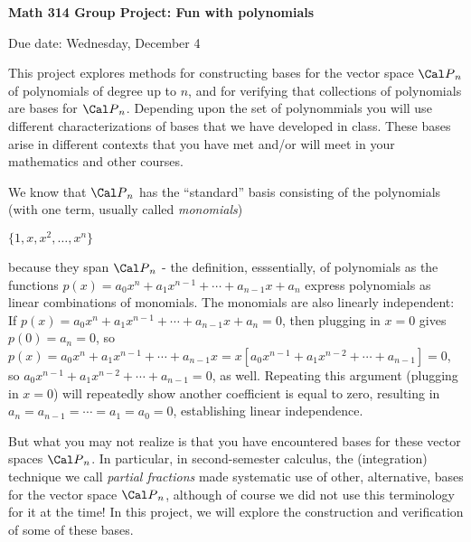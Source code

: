 


\loadmsbm

\def\dsp{\displaystyle}
\def\ssk{\smallskip}
\def\msk{\medskip}
\def\bsk{\bigskip}
\def\ctln{\centerline}
\def\nidt{\noindent}
\def\ubr{\underbar}


\centerline{\bf Math 314 Group Project: Fun with polynomials}

\medskip

\centerline{Due date: Wednesday, December 4}

\medskip

This project explores methods for constructing bases for the
vector space ${\Cal P}_n$ of polynomials of degree up to $n$,
and for verifying that collections of polynomials are bases
for ${\Cal P}_n$. Depending upon the set of polynommials
you will use different characterizations of bases that we 
have developed in class. These bases arise in different
contexts that you have met and/or will meet in your 
mathematics and other courses.

\medskip

We know that ${\Cal P}_n$ has the ``standard'' basis consisting
of the polynomials (with one term, usually called {\it monomials})

\ssk

\ctln{$\{1,x,x^2,\ldots,x^n\}$}

\ssk

\nidt because they span ${\Cal P}_n$ - the definition, esssentially, 
of polynomials as the functions $p(x)=a_0x^n+a_1x^{n-1}+\cdots +a_{n-1}x+a_n$ 
express polynomials as linear combinations of monomials. The monomials are also linearly independent:
If $p(x)=a_0x^n+a_1x^{n-1}+\cdots +a_{n-1}x+a_n=0$, then plugging in $x=0$ gives
$p(0)=a_n=0$, so $p(x)=a_0x^n+a_1x^{n-1}+\cdots +a_{n-1}x=x[a_0x^{n-1}+a_1x^{n-2}+\cdots +a_{n-1}]=0$,
so $a_0x^{n-1}+a_1x^{n-2}+\cdots +a_{n-1}=0$, as well. Repeating this argument (plugging in $x=0$)
will repeatedly show another coefficient is equal to zero, resulting in 
$a_n=a_{n-1}= \cdots = a_1=a_0=0$, establishing linear independence.

\msk

But what you may not realize is that you have \ubr{already} encountered \ubr{other} bases for these
vector spaces ${\Cal P}_n$. In particular, in second-semester calculus, the (integration) technique
we call {\it partial fractions} made systematic use of other, alternative, bases for the vector
space ${\Cal P}_n$, although of course we did not use this terminology for it at the time!
In this project, we will explore the construction and verification of some of these
bases.

